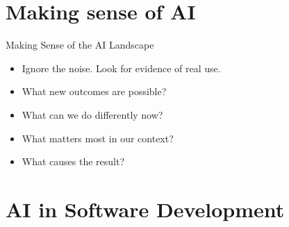 

\section{Making sense of AI}

\begin{frame}{Making Sense of the AI Landscape}
  \begin{itemize}
    \item Ignore the noise. Look for evidence of real use.
    \item What new outcomes are possible?
    \item What can we do differently now?
    \item What matters most in our context?
    \item What causes the result?
  \end{itemize}

  \end{frame}

\section{AI in Software Development}

